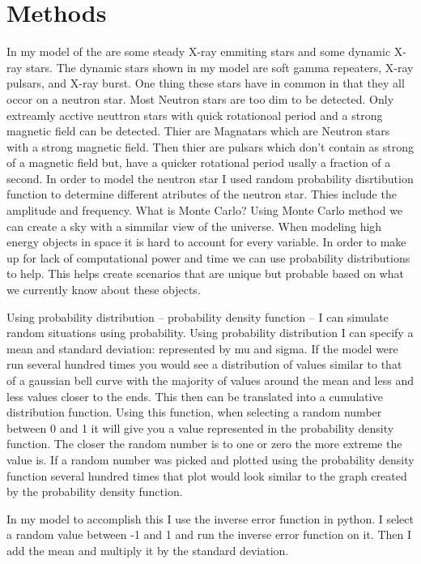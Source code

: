 \documentclass[final,6p,times,twocolumn,authoryear]{elsarticle}
\begin{document}
\section{Methods}
In my model of the are some steady X-ray emmiting stars and some dynamic X-ray stars. The dynamic stars shown in my model are soft gamma repeaters, X-ray pulsars, and X-ray burst. One thing these stars have in common in that they all occor on a neutron star. Most Neutron stars are too dim to be detected. Only extreamly acctive neuttron stars with quick rotationoal period and a strong magnetic field can be detected. Thier are Magnatars which are Neutron stars with a strong magnetic field. Then thier are pulsars which don't contain as strong of a magnetic field but, have a quicker rotational period usally a fraction of a second. 
In order to model the neutron star I used random probability disrtibution function to determine different atributes of the neutron star. Thies include the amplitude and frequency. 
What is Monte Carlo?
Using Monte Carlo method we can create a sky with a simmilar view of the universe.
When modeling high energy objects in space it is hard to account for every variable. In order to make up for lack of computational power and time we can use probability distributions to help. This helps create scenarios that are unique but probable based on what we currently know about these objects. 

Using probability distribution – probability density function – I can simulate random situations using probability. Using probability distribution I can specify a mean and standard deviation: represented by mu and sigma. If the model were run several hundred times you would see a distribution of values similar to that of a gaussian bell curve with the majority of values around the mean and less and less values closer to the ends. This then can be translated into a cumulative distribution function. Using this function, when selecting a random number between 0 and 1 it will give you a value represented in the probability density function. The closer the random number is to one or zero the more extreme the value is. If a random number was picked and plotted using the probability density function several hundred times that plot would look similar to the graph created by the probability density function.

        In my model to accomplish this I use the inverse error function in python. I select a random value between -1 and 1 and run the inverse error function on it. Then I add the mean and multiply it by the standard deviation.
        
\end{document}
